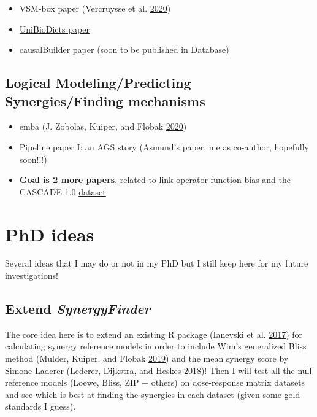 \documentclass[
  12pt,
]{book}
\providecommand{\tightlist}{%
  \setlength{\itemsep}{0pt}\setlength{\parskip}{0pt}}
\begin{document}
\begin{itemize}
\tightlist
\item
  VSM-box paper (Vercruysse et al. \protect\hyperlink{ref-vercruysse2020vsm}{2020})
\item
  \protect\hyperlink{vsm}{UniBioDicts paper}
\item
  causalBuilder paper (soon to be published in Database)
\end{itemize}

\hypertarget{logical-modelingpredicting-synergiesfinding-mechanisms}{%
\section*{Logical Modeling/Predicting Synergies/Finding mechanisms}\label{logical-modelingpredicting-synergiesfinding-mechanisms}}

\begin{itemize}
\tightlist
\item
  emba (J. Zobolas, Kuiper, and Flobak \protect\hyperlink{ref-Zobolas2020}{2020})
\item
  Pipeline paper I: an AGS story (Asmund's paper, me as co-author, hopefully soon!!!)
\item
  \textbf{Goal is 2 more papers}, related to link operator function bias and the CASCADE 1.0 \href{https://doi.org/10.5281/zenodo.4022783}{dataset}
\end{itemize}

\hypertarget{phd-ideas}{%
\chapter{PhD ideas}\label{phd-ideas}}

Several ideas that I may do or not in my PhD but I still keep here for my future
investigations!

\hypertarget{synergy-finder}{%
\section*{\texorpdfstring{Extend \emph{SynergyFinder}}{Extend SynergyFinder}}\label{synergy-finder}}

The core idea here is to extend an existing R package (Ianevski et al. \protect\hyperlink{ref-Ianevski2017}{2017}) for calculating synergy reference models in order to include Wim's generalized Bliss method (Mulder, Kuiper, and Flobak \protect\hyperlink{ref-Mulder2019}{2019}) and the mean synergy score by Simone Laderer (Lederer, Dijkstra, and Heskes \protect\hyperlink{ref-Lederer2018}{2018})!
Then I will test all the null reference models (Loewe, Bliss, ZIP + others) on dose-response matrix datasets and see which is best at finding the synergies in each dataset (given some gold standards I guess).
\end{document}
